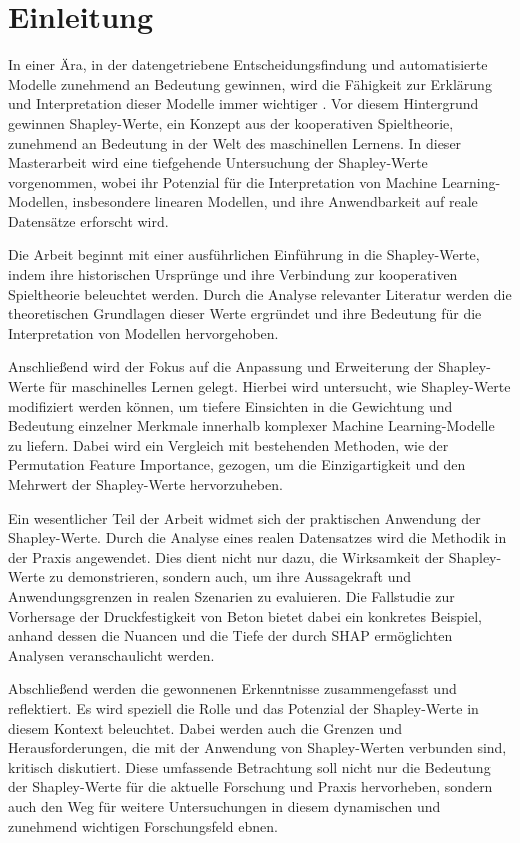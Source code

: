 \chapter{Einleitung}

In einer Ära, in der datengetriebene Entscheidungsfindung und automatisierte Modelle zunehmend an Bedeutung gewinnen, 
wird die Fähigkeit zur Erklärung und Interpretation dieser Modelle immer wichtiger \cite[S. 3]{Molnar_2023}. 
Vor diesem Hintergrund gewinnen 
Shapley-Werte, ein Konzept aus der kooperativen Spieltheorie, zunehmend an Bedeutung in der Welt des maschinellen Lernens. 
In dieser Masterarbeit wird eine tiefgehende Untersuchung der Shapley-Werte vorgenommen, wobei ihr Potenzial für die 
Interpretation von Machine Learning-Modellen, insbesondere linearen Modellen, und ihre Anwendbarkeit auf reale Datensätze 
erforscht wird.

Die Arbeit beginnt mit einer ausführlichen Einführung in die Shapley-Werte, indem ihre historischen Ursprünge 
und ihre Verbindung zur kooperativen Spieltheorie beleuchtet werden. Durch die Analyse relevanter Literatur 
werden die theoretischen Grundlagen dieser Werte ergründet und ihre Bedeutung für die Interpretation von Modellen hervorgehoben.

Anschließend wird der Fokus auf die Anpassung und Erweiterung der Shapley-Werte für maschinelles Lernen gelegt. 
Hierbei wird untersucht, wie Shapley-Werte modifiziert werden können, um tiefere Einsichten in die Gewichtung 
und Bedeutung einzelner Merkmale innerhalb komplexer Machine Learning-Modelle zu liefern. Dabei wird ein Vergleich 
mit bestehenden Methoden, wie der Permutation Feature Importance, gezogen, um die Einzigartigkeit und den Mehrwert der 
Shapley-Werte hervorzuheben.

Ein wesentlicher Teil der Arbeit widmet sich der praktischen Anwendung der Shapley-Werte. Durch die Analyse 
eines realen Datensatzes wird die Methodik in der Praxis angewendet. Dies dient nicht nur dazu, die Wirksamkeit 
der Shapley-Werte zu demonstrieren, sondern auch, um ihre Aussagekraft und Anwendungsgrenzen in realen Szenarien 
zu evaluieren. Die Fallstudie zur Vorhersage der Druckfestigkeit von Beton bietet dabei ein konkretes Beispiel, 
anhand dessen die Nuancen und die Tiefe der durch SHAP ermöglichten Analysen veranschaulicht werden.

Abschließend werden die gewonnenen Erkenntnisse zusammengefasst und reflektiert. Es wird speziell die Rolle und das 
Potenzial der Shapley-Werte in diesem Kontext beleuchtet. Dabei werden auch die Grenzen und Herausforderungen, 
die mit der Anwendung von Shapley-Werten verbunden sind, kritisch diskutiert. Diese umfassende Betrachtung soll 
nicht nur die Bedeutung der Shapley-Werte für die aktuelle Forschung und Praxis hervorheben, sondern auch den Weg 
für weitere Untersuchungen in diesem dynamischen und zunehmend wichtigen Forschungsfeld ebnen.